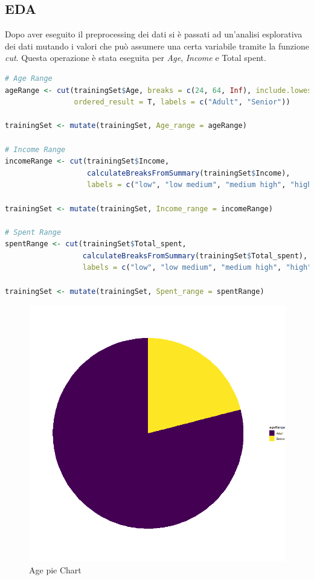 \documentclass[letterpaper,11pt]{article}
\begin{document}
\subsection{EDA}
Dopo aver eseguito il preprocessing dei dati si è passati ad un'analisi esplorativa dei dati mutando i valori che può assumere una certa variabile tramite la funzione \textit{cut}. 
Questa operazione è stata eseguita per \textit{Age}, \textit{Income} e Total spent. 

\begin{lstlisting}[language=R]
# Age Range
ageRange <- cut(trainingSet$Age, breaks = c(24, 64, Inf), include.lowest = T,
                ordered_result = T, labels = c("Adult", "Senior"))

trainingSet <- mutate(trainingSet, Age_range = ageRange)

# Income Range
incomeRange <- cut(trainingSet$Income, 
                   calculateBreaksFromSummary(trainingSet$Income),
                   labels = c("low", "low medium", "medium high", "high"))

trainingSet <- mutate(trainingSet, Income_range = incomeRange)

# Spent Range
spentRange <- cut(trainingSet$Total_spent, 
                  calculateBreaksFromSummary(trainingSet$Total_spent),
                  labels = c("low", "low medium", "medium high", "high"))

trainingSet <- mutate(trainingSet, Spent_range = spentRange)
\end{lstlisting}

\begin{figure}[h!]
    \centering
    \includegraphics[width=.4\textwidth]{Img/EDA/EDA001.png}
    \caption{Age pie Chart}
\end{figure}
\end{document}
